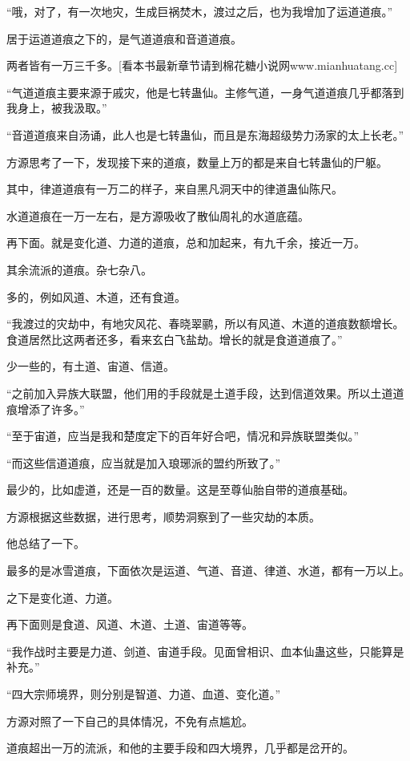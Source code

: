 \begin{this_body}
“哦，对了，有一次地灾，生成巨祸焚木，渡过之后，也为我增加了运道道痕。”

居于运道道痕之下的，是气道道痕和音道道痕。

两者皆有一万三千多。[看本书最新章节请到棉花糖小说网www.mianhuatang.cc]

“气道道痕主要来源于戚灾，他是七转蛊仙。主修气道，一身气道道痕几乎都落到我身上，被我汲取。”

“音道道痕来自汤诵，此人也是七转蛊仙，而且是东海超级势力汤家的太上长老。”

方源思考了一下，发现接下来的道痕，数量上万的都是来自七转蛊仙的尸躯。

其中，律道道痕有一万二的样子，来自黑凡洞天中的律道蛊仙陈尺。

水道道痕在一万一左右，是方源吸收了散仙周礼的水道底蕴。

再下面。就是变化道、力道的道痕，总和加起来，有九千余，接近一万。

其余流派的道痕。杂七杂八。

多的，例如风道、木道，还有食道。

“我渡过的灾劫中，有地灾风花、春晓翠鹂，所以有风道、木道的道痕数额增长。食道居然比这两者还多，看来玄白飞盐劫。增长的就是食道道痕了。”

少一些的，有土道、宙道、信道。

“之前加入异族大联盟，他们用的手段就是土道手段，达到信道效果。所以土道道痕增添了许多。”

“至于宙道，应当是我和楚度定下的百年好合吧，情况和异族联盟类似。”

“而这些信道道痕，应当就是加入琅琊派的盟约所致了。”

最少的，比如虚道，还是一百的数量。这是至尊仙胎自带的道痕基础。

方源根据这些数据，进行思考，顺势洞察到了一些灾劫的本质。

他总结了一下。

最多的是冰雪道痕，下面依次是运道、气道、音道、律道、水道，都有一万以上。

之下是变化道、力道。

再下面则是食道、风道、木道、土道、宙道等等。

“我作战时主要是力道、剑道、宙道手段。见面曾相识、血本仙蛊这些，只能算是补充。”

“四大宗师境界，则分别是智道、力道、血道、变化道。”

方源对照了一下自己的具体情况，不免有点尴尬。

道痕超出一万的流派，和他的主要手段和四大境界，几乎都是岔开的。


\end{this_body}

